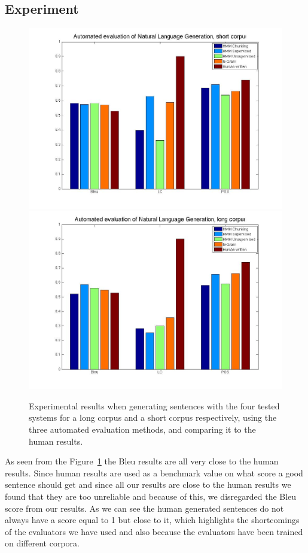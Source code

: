 \documentclass[a4paper,12pt]{article}
\begin{document}
\subsection{Experiment}
\begin{figure}
\centering
\includegraphics[width=0.8\linewidth]{resultsShort}
\includegraphics[width=0.8\linewidth]{results}
\caption{Experimental results when generating sentences with the four tested systems 
for a long corpus and a short corpus respectively, using the three automated
evaluation methods, and comparing it to the human results.}
\label{fig:longresults}
\end{figure}

As seen from the Figure~\ref{fig:longresults} the Bleu results are all very close 
to the human results. Since human results are used as a benchmark value on 
what score a good sentence should get and since all our results are close to the 
human results we found that they are too unreliable  and because of this, 
we disregarded the Bleu score from our results.
As we can see the human generated sentences do not always have a score 
equal to 1 but close to it, which highlights the shortcomings of the evaluators we
have used and also because the evaluators have been trained on different corpora.
\end{document}
